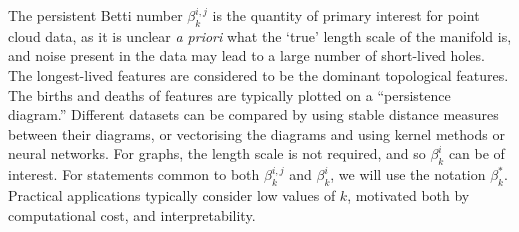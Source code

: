 \begin{refsection}
The persistent Betti number $\beta_k^{i,j}$ is the quantity of primary interest for point cloud data, as it is unclear \textit{a priori} what the `true' length scale of the manifold is, and noise present in the data may lead to a large number of short-lived holes. The longest-lived features are considered to be the dominant topological features. The births and deaths of features are typically plotted on a ``persistence diagram.'' Different datasets can be compared by using stable distance measures between their diagrams, or vectorising the diagrams and using kernel methods or neural networks. For graphs, the length scale is not required, and so $\beta_k^i$ can be of interest. For statements common to both $\beta_k^{i,j}$ and $\beta_k^i$, we will use the notation $\beta_k^*$. Practical applications typically consider low values of $k$, motivated both by computational cost, and interpretability. 






\end{refsection}
